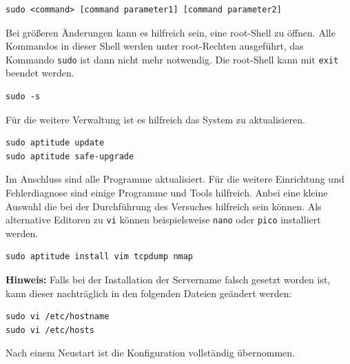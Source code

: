 \begin{lstlisting}
sudo <command> [command parameter1] [command parameter2] 
\end{lstlisting}

Bei größeren Änderungen kann es hilfreich sein, eine root-Shell zu öffnen. Alle
Kommandos in dieser Shell werden unter root-Rechten ausgeführt, das Kommando
\texttt{sudo} ist dann nicht mehr notwendig. Die root-Shell kann mit 
\texttt{exit} beendet werden.

\begin{lstlisting}
sudo -s
\end{lstlisting}

Für die weitere Verwaltung ist es hilfreich das System zu aktualisieren.

\begin{lstlisting}
sudo aptitude update
sudo aptitude safe-upgrade 
\end{lstlisting}

Im Anschluss sind alle Programme aktualisiert. Für die weitere Einrichtung und
Fehlerdiagnose sind einige Programme und Tools hilfreich. Anbei eine kleine
Auswahl die bei der Durchführung des Versuches hilfreich sein können.
Als alternative Editoren zu \texttt{vi} können beispielsweise \texttt{nano}
oder \texttt{pico} installiert werden.

\begin{lstlisting}
sudo aptitude install vim tcpdump nmap
\end{lstlisting}

\textbf{Hinweis:} Falls bei der Installation der Servername falsch gesetzt
worden ist, kann dieser nachträglich in den folgenden Dateien geändert werden:
\begin{lstlisting}
sudo vi /etc/hostname
sudo vi /etc/hosts
\end{lstlisting}
Nach einem Neustart ist die Konfiguration vollständig übernommen.

